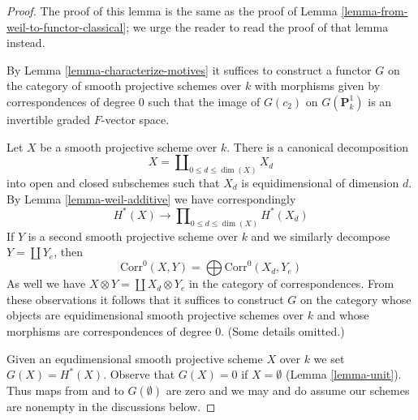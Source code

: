 \documentclass{stacks-project}
\theoremstyle{plain}
\theoremstyle{definition}
\theoremstyle{remark}
\numberwithin{equation}{subsection}
\begin{document}
\begin{proof}
The proof of this lemma is the same as the proof of
Lemma \ref{lemma-from-weil-to-functor-classical};
we urge the reader to read the proof of that lemma instead.

\medskip\noindent
By Lemma \ref{lemma-characterize-motives} it suffices to construct a functor
$G$ on the category of smooth projective schemes over $k$
with morphisms given by correspondences of degree $0$ such that
the image of $G(c_2)$ on $G(\mathbf{P}^1_k)$ is an invertible graded
$F$-vector space.

\medskip\noindent
Let $X$ be a smooth projective scheme over $k$. There is a canonical
decomposition
$$
X = \coprod\nolimits_{0 \leq d \le \dim(X)} X_d
$$
into open and closed subschemes such that $X_d$ is equidimensional
of dimension $d$. By Lemma \ref{lemma-weil-additive} we have correspondingly
$$
H^*(X) \longrightarrow \prod\nolimits_{0 \leq d \le \dim(X)} H^*(X_d)
$$
If $Y$ is a second smooth projective scheme over $k$
and we similarly decompose $Y = \coprod Y_e$, then
$$
\text{Corr}^0(X, Y) = \bigoplus \text{Corr}^0(X_d, Y_e)
$$
As well we have $X \otimes Y = \coprod X_d \otimes Y_e$ in the
category of correspondences. From these observations it follows
that it suffices to construct $G$ on the category whose objects
are equidimensional smooth projective schemes over $k$
and whose morphisms are correspondences of degree $0$. (Some details
omitted.)

\medskip\noindent
Given an equdimensional smooth projective scheme
$X$ over $k$ we set $G(X) = H^*(X)$. Observe that $G(X) = 0$
if $X = \emptyset$ (Lemma \ref{lemma-unit}). Thus maps
from and to $G(\emptyset)$ are zero and we may and do
assume our schemes are nonempty in the discussions below.


\end{proof}
\end{document}
